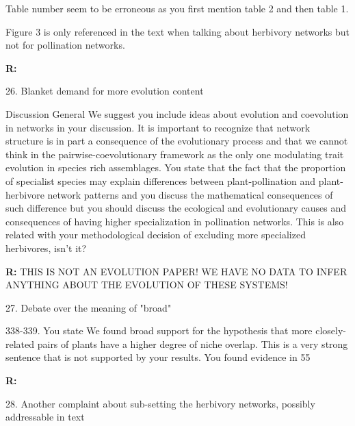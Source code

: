 \documentclass[12pt]{letter}
\newenvironment{refquote}{\bigskip \begin{it}}{\end{it}\smallskip}
\begin{document}
		\begin{refquote}
			Table number seem to be erroneous as you first mention table 2 and then table 1.

			\smallskip

			Figure 3 is only referenced in the text when talking about herbivory networks but not for pollination networks.
		\end{refquote}

		\textbf{R:}


	26. Blanket demand for more evolution content

		\begin{refquote}
			Discussion
			General
			We suggest you include ideas about evolution and coevolution in networks in your discussion. It is important to recognize that network structure is in part a consequence of the evolutionary process and that we cannot think in the pairwise-coevolutionary framework as the only one modulating trait evolution in species rich assemblages.
			You state that the fact that the proportion of specialist species may explain differences between plant-pollination and plant-herbivore network patterns and you discuss the mathematical consequences of such difference but you should discuss the ecological and evolutionary causes and consequences of having higher specialization in pollination networks. This is also related with your methodological decision of excluding more specialized herbivores, isn't it?
		\end{refquote}

		\textbf{R:} THIS IS NOT AN EVOLUTION PAPER! WE HAVE NO DATA TO INFER ANYTHING ABOUT THE EVOLUTION OF THESE SYSTEMS!


	27. Debate over the meaning of "broad"

		\begin{refquote}
			338-339. You state We found broad support for the hypothesis that more closely-related pairs of plants have a higher degree of niche overlap. This is a very strong sentence that is not supported by your results. You found evidence in 55%
		\end{refquote}


		\textbf{R:}


	28. Another complaint about sub-setting the herbivory networks, possibly addressable in text
\end{document}
